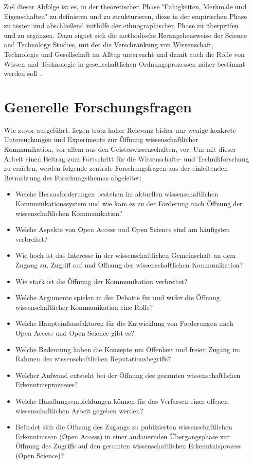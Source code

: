 Ziel dieser Abfolge ist es, in der theoretischen Phase "Fähigkeiten, Merkmale und Eigenschaften" \cite{Raab-Steiner_2012} zu definieren und zu strukturieren, diese in der empirischen Phase zu testen und abschließend mithilfe der ethnographischen Phase zu überprüfen und zu ergänzen. Dazu eignet sich die methodische Herangehensweise der Science and Technology Studies, mit der die Verschränkung von Wissenschaft, Technologie und Gesellschaft im Alltag untersucht und damit auch die Rolle von Wissen und Technologie in gesellschaftlichen Ordnungsprozessen näher bestimmt werden soll \cite{Beck_2014}.

\section{Generelle Forschungsfragen}

Wie zuvor ausgeführt, liegen trotz hoher Relevanz bisher nur wenige konkrete Untersuchungen und Experimente zur Öffnung wissenschaftlicher Kommunikation, vor allem aus den Geisteswissenschaften, vor. Um mit dieser Arbeit einen Beitrag zum Fortschritt für die Wissenschafts- und Technikforschung zu erzielen, werden folgende zentrale Forschungsfragen aus der einleitenden Betrachtung des Forschungsthemas abgeleitet:
\begin{itemize}
\item Welche Herausforderungen bestehen im aktuellen wissenschaftlichen Kommunikationssystem und wie kam es zu der Forderung nach Öffnung der wissenschaftlichen Kommunikation?
\item Welche Aspekte von Open Access und Open Science sind am häufigsten verbreitet?
\item Wie hoch ist das Interesse in der wissenschaftlichen Gemeinschaft an dem Zugang zu, Zugriff auf und Öffnung der wissenschaftlichen Kommunikation?
\item Wie stark ist die Öffnung der Kommunikation verbreitet?
\item Welche Argumente spielen in der Debatte für und wider die Öffnung wissenschaftlicher Kommunikation eine Rolle?
\item Welche Haupteinflussfaktoren für die Entwicklung von Forderungen nach Open Access und Open Science gibt es?
\item Welche Bedeutung haben die Konzepte um Offenheit und freien Zugang im Rahmen des wissenschaftlichen Reputationsbegriffs?
\item Welcher Aufwand entsteht bei der Öffnung des gesamten wissenschaftlichen Erkenntnisprozesses?
\item Welche Handlungsempfehlungen können für das Verfassen einer offenen wissenschaftlichen Arbeit gegeben werden?
\item Befindet sich die Öffnung des Zugangs zu publizierten wissenschaftlichen Erkenntnissen (Open Access) in einer andauernden Übergangsphase zur Öffnung des Zugriffs auf den gesamten wissenschaftlichen Erkenntnisprozess (Open Science)?
\end{itemize}

